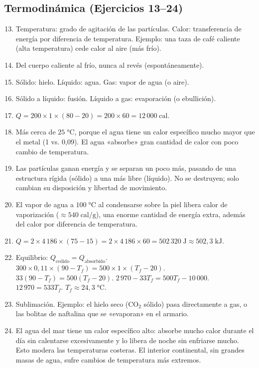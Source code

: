 \documentclass[12pt, letterpaper]{article}
\begin{document}
  \subsection*{Termodinámica (Ejercicios 13--24)}

  \begin{enumerate}[leftmargin=*, label=\textbf{\arabic*.}]
    \setcounter{enumi}{12}
    \item Temperatura: grado de agitación de las partículas. Calor: transferencia de energía por diferencia de temperatura. Ejemplo: una taza de café caliente (alta temperatura) cede calor al aire (más frío).

    \item Del cuerpo caliente al frío, nunca al revés (espontáneamente).

    \item Sólido: hielo. Líquido: agua. Gas: vapor de agua (o aire).

    \item Sólido a líquido: fusión. Líquido a gas: evaporación (o ebullición).

    \item $Q = 200 \times 1 \times (80 - 20) = 200 \times 60 = 12\,000\;\text{cal}$.

    \item Más cerca de $25\;°\text{C}$, porque el agua tiene un calor específico mucho mayor que el metal (1 vs. 0,09). El agua «absorbe» gran cantidad de calor con poco cambio de temperatura.

    \item Las partículas ganan energía y se separan un poco más, pasando de una estructura rígida (sólido) a una más libre (líquido). No se destruyen; solo cambian su disposición y libertad de movimiento.

    \item El vapor de agua a $100\;°\text{C}$ al condensarse sobre la piel libera calor de vaporización ($\approx 540\;\text{cal/g}$), una enorme cantidad de energía extra, además del calor por diferencia de temperatura.

    \item $Q = 2 \times 4\,186 \times (75 - 15) = 2 \times 4\,186 \times 60 = 502\,320\;\text{J} \approx 502{,}3\;\text{kJ}$.

    \item Equilibrio: $Q_{\text{cedido}} = Q_{\text{absorbido}}$. $300 \times 0{,}11 \times (90 - T_f) = 500 \times 1 \times (T_f - 20)$. $33(90 - T_f) = 500(T_f - 20)$. $2\,970 - 33T_f = 500T_f - 10\,000$. $12\,970 = 533T_f$. $T_f \approx 24{,}3\;°\text{C}$.

    \item Sublimación. Ejemplo: el hielo seco (CO$_2$ sólido) pasa directamente a gas, o las bolitas de naftalina que se «evaporan» en el armario.

    \item El agua del mar tiene un calor específico alto: absorbe mucho calor durante el día sin calentarse excesivamente y lo libera de noche sin enfriarse mucho. Esto modera las temperaturas costeras. El interior continental, sin grandes masas de agua, sufre cambios de temperatura más extremos.
  \end{enumerate}
\end{document}
